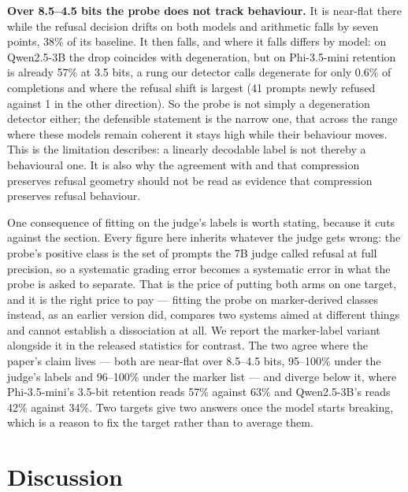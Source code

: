 \documentclass[11pt,a4paper]{article}
\begin{document}
\begin{keybox}
\textbf{Over 8.5--4.5 bits the probe does not track behaviour.} It is near-flat
there while the refusal decision drifts on both models and
arithmetic falls by seven points, 38\% of its baseline. It then falls, and where
it falls differs by model: on Qwen2.5-3B the drop coincides with degeneration,
but on Phi-3.5-mini retention is already 57\% at 3.5 bits, a rung our detector
calls degenerate for only 0.6\% of completions and where the refusal shift is
largest (41 prompts newly refused against 1 in the other direction). So the probe
is not simply a degeneration detector either; the
defensible statement is the narrow one, that across the range where these models
remain coherent it stays high while their behaviour moves. This is the
limitation \citet{belinkov2022probing} describes: a linearly decodable label is
not thereby a behavioural one. It is also why the agreement with
\citet{chhabra2025refusal} and \citet{duan2026monitors} that compression
preserves refusal geometry should not be read as evidence that compression
preserves refusal behaviour.
\end{keybox}

One consequence of fitting on the judge's labels is worth stating, because it
cuts against the section. Every figure here inherits whatever the judge gets
wrong: the probe's positive class is the set of prompts the 7B judge called
refusal at full precision, so a systematic grading error becomes a systematic
error in what the probe is asked to separate. That is the price of putting both
arms on one target, and it is the right price to pay --- fitting the probe on
marker-derived classes instead, as an earlier version did, compares two systems
aimed at different things and cannot establish a dissociation at all. We report
the marker-label variant alongside it in the released statistics for contrast.
The two agree where the paper's claim lives --- both are near-flat over
8.5--4.5 bits, 95--100\% under the judge's labels and 96--100\% under the
marker list --- and diverge below it, where Phi-3.5-mini's 3.5-bit retention
reads 57\% against 63\% and Qwen2.5-3B's reads 42\% against 34\%. Two targets
give two answers once the model starts breaking, which is a reason to fix the
target rather than to average them.

\section{Discussion}
\label{sec:discussion}
\end{document}

